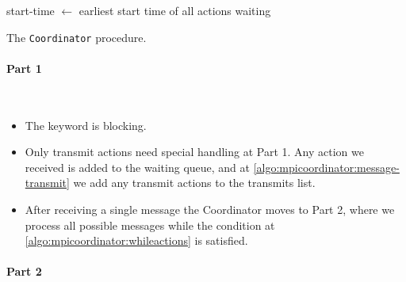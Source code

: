 \begin{algorithm}[H]
{{{                
            }
            \;
            start-time $\leftarrow$ earliest start time of all actions \KwInn waiting\;
        }
    }
    \caption{The \texttt{Coordinator} procedure.}
    \label{algo:mpicoordinator}
\end{algorithm}

\clearpage


\paragraph{Part 1} \

\begin{itemize}
    \item The \KwAwait keyword is blocking.
    \item Only transmit actions need special handling at Part 1. Any action we received is added to the waiting queue, and at \autoref{algo:mpicoordinator:message-transmit} we add any transmit actions to the transmits list.
    \item After receiving a single message the Coordinator moves to Part 2, where we process all possible messages while the condition at \autoref{algo:mpicoordinator:whileactions} is satisfied.
\end{itemize}

\paragraph{Part 2} \

